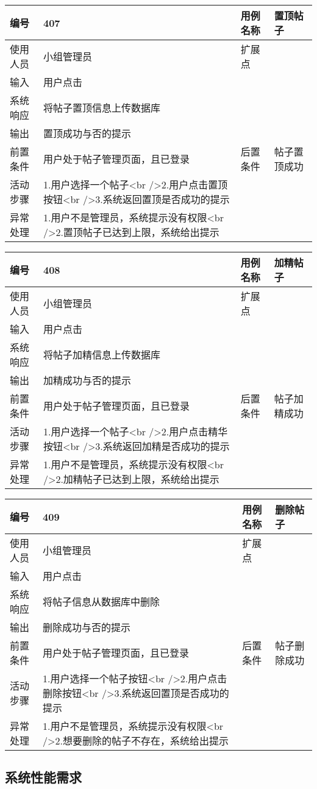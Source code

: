 \documentclass[
]{article}
\begin{document}
\begin{longtable}[]{@{}llll@{}}
\toprule
编号 & 407 & 用例名称 & 置顶帖子\tabularnewline
\midrule
\endhead
使用人员 & 小组管理员 & 扩展点 &\tabularnewline
输入 & 用户点击 & &\tabularnewline
系统响应 & 将帖子置顶信息上传数据库 & &\tabularnewline
输出 & 置顶成功与否的提示 & &\tabularnewline
前置条件 & 用户处于帖子管理页面，且已登录 & 后置条件 &
帖子置顶成功\tabularnewline
活动步骤 & 1.用户选择一个帖子\textless br
/\textgreater{}2.用户点击置顶按钮\textless br
/\textgreater{}3.系统返回置顶是否成功的提示 & &\tabularnewline
异常处理 & 1.用户不是管理员，系统提示没有权限\textless br
/\textgreater{}2.置顶帖子已达到上限，系统给出提示 & &\tabularnewline
\bottomrule
\end{longtable}

\begin{longtable}[]{@{}llll@{}}
\toprule
编号 & 408 & 用例名称 & 加精帖子\tabularnewline
\midrule
\endhead
使用人员 & 小组管理员 & 扩展点 &\tabularnewline
输入 & 用户点击 & &\tabularnewline
系统响应 & 将帖子加精信息上传数据库 & &\tabularnewline
输出 & 加精成功与否的提示 & &\tabularnewline
前置条件 & 用户处于帖子管理页面，且已登录 & 后置条件 &
帖子加精成功\tabularnewline
活动步骤 & 1.用户选择一个帖子\textless br
/\textgreater{}2.用户点击精华按钮\textless br
/\textgreater{}3.系统返回加精是否成功的提示 & &\tabularnewline
异常处理 & 1.用户不是管理员，系统提示没有权限\textless br
/\textgreater{}2.加精帖子已达到上限，系统给出提示 & &\tabularnewline
\bottomrule
\end{longtable}

\begin{longtable}[]{@{}llll@{}}
\toprule
编号 & 409 & 用例名称 & 删除帖子\tabularnewline
\midrule
\endhead
使用人员 & 小组管理员 & 扩展点 &\tabularnewline
输入 & 用户点击 & &\tabularnewline
系统响应 & 将帖子信息从数据库中删除 & &\tabularnewline
输出 & 删除成功与否的提示 & &\tabularnewline
前置条件 & 用户处于帖子管理页面，且已登录 & 后置条件 &
帖子删除成功\tabularnewline
活动步骤 & 1.用户选择一个帖子按钮\textless br
/\textgreater{}2.用户点击删除按钮\textless br
/\textgreater{}3.系统返回置顶是否成功的提示 & &\tabularnewline
异常处理 & 1.用户不是管理员，系统提示没有权限\textless br
/\textgreater{}2.想要删除的帖子不存在，系统给出提示 & &\tabularnewline
\bottomrule
\end{longtable}

\hypertarget{header-n1232}{%
\subsection{系统性能需求}\label{header-n1232}}
\end{document}
